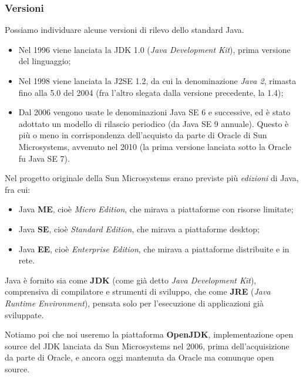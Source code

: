 \documentclass[a4paper,11pt]{article}
\begin{document}
\subsubsection{Versioni}
Possiamo individuare alcune versioni di rilevo dello standard Java.
\begin{itemize}
	\item Nel 1996 viene lanciata la JDK 1.0 (\textit{Java Development Kit}), prima versione del linguaggio;
	\item Nel 1998 viene lanciata la J2SE 1.2, da cui la denominazione \textit{Java 2}, rimasta fino alla 5.0 del 2004 (fra l'altro slegata dalla versione precedente, la 1.4);
	\item Dal 2006 vengono usate le denominazioni Java SE 6 e successive, ed è stato adottato un modello di rilascio periodico (da Java SE 9 annuale).
		Questo è più o meno in corrispondenza dell'acquisto da parte di Oracle di Sun Microsystems, avvenuto nel 2010 (la prima versione lanciata sotto la Oracle fu Java SE 7).
\end{itemize}

Nel progetto originale della Sun Microsystems erano previste più \textit{edizioni} di Java, fra cui:
\begin{itemize}
	\item Java \textbf{ME}, cioè \textit{Micro Edition}, che mirava a piattaforme con risorse limitate;
	\item Java \textbf{SE}, cioè \textit{Standard Edition}, che mirava a piattaforme desktop;
	\item Java \textbf{EE}, cioè \textit{Enterprise Edition}, che mirava a piattaforme distribuite e in rete.
\end{itemize}

Java è fornito sia come \textbf{JDK} (come già detto \textit{Java Development Kit}), comprensiva di compilatore e strumenti di sviluppo, che come \textbf{JRE} (\textit{Java Runtime Environment}), pensata solo per l'esecuzione di applicazioni già sviluppate.

Notiamo poi che noi useremo la piattaforma \textbf{OpenJDK}, implementazione open source del JDK lanciata da Sun Microsystems nel 2006, prima dell'acquisizione da parte di Oracle, e ancora oggi mantenuta da Oracle ma comunque open source. 
\end{document}
